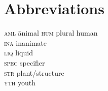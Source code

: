 \documentclass[output=paper,modfonts,nonflat]{langsci/langscibook}
\begin{document}
\section*{Abbreviations}
\begin{multicols}{2}
	\begin{tabbing}
		\textsc{aml}\hspace{1em} \= animal \kill
		\textsc{hum} \> plural human \\
		\textsc{ina} \> inanimate \\
		\textsc{liq} \> liquid \\
		\textsc{spec} \> specifier \\ 
		\textsc{str} \> plant/structure \\
		\textsc{yth} \> youth
	\end{tabbing}
\end{multicols}

{\sloppy
\printbibliography[heading=subbibliography,notkeyword=this]
}
\end{document}
